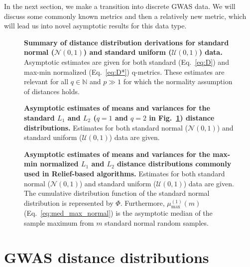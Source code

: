 \documentclass[10pt,letterpaper]{article}
\begin{document}
In the next section, we make a transition into discrete GWAS data. We will discuss some commonly known metrics and then a relatively new metric, which will lead us into novel asymptotic results for this data type.

\begin{figure}[H]
	\centering
	\caption{{\bf Summary of distance distribution derivations for standard normal ($\mathcal{N}(0,1)$) and standard uniform ($\mathcal{U}(0,1)$) data.} Asymptotic estimates are given for both standard (Eq.~\ref{eq:D}) and max-min normalized (Eq.~\ref{eq:D*}) q-metrics. These estimates are relevant for all $q \in \mathbb{N}$ and $p \gg 1$ for which the normality assumption of distances holds.}
	\label{tab:dist_distr_general1}
\end{figure}

\begin{figure}[H]
	\centering
	\caption{{\bf Asymptotic estimates of means and variances for the standard $L_1$ and $L_2$ ($q=1$ and $q=2$ in Fig.~\ref{tab:dist_distr_general1}) distance distributions.} Estimates for both standard normal ($\mathcal{N}(0,1)$) and standard uniform ($\mathcal{U}(0,1)$) data are given.}
	\label{tab:dist_distr_standardL1L2}
\end{figure}

\begin{figure}[H]
	\centering
	\caption{{\bf Asymptotic estimates of means and variances for the max-min normalized $L_1$ and $L_2$ distance distributions commonly used in Relief-based algorithms.} Estimates for both standard normal ($\mathcal{N}(0,1)$) and standard uniform ($\mathcal{U}(0,1)$) data are given. The cumulative distribution function of the standard normal distribution is represented by $\Phi$. Furthermore, $\mu^{(1)}_\text{max}(m)$ (Eq.~\ref{eq:med_max_normal}) is the asymptotic median of the sample maximum from $m$ standard normal random samples.}
	\label{tab:dist_distr_normalizedL1L2}
\end{figure}

\section*{GWAS distance distributions}\label{sec:gwas_distances}
\end{document}
